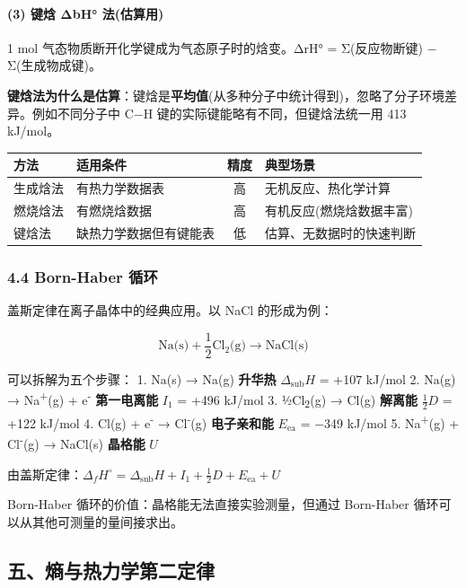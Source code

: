 \paragraph{(3) 键焓 ΔbH° 法(估算用)}\label{ux952eux7113-ux3b4bh-ux6cd5ux4f30ux7b97ux7528}

1 mol 气态物质断开化学键成为气态原子时的焓变。ΔrH° = Σ(反应物断键) − Σ(生成物成键)。

\textbf{键焓法为什么是估算}：键焓是\textbf{平均值}(从多种分子中统计得到)，忽略了分子环境差异。例如不同分子中 C−H 键的实际键能略有不同，但键焓法统一用 413 kJ/mol。

{\def\LTcaptype{none} %
\begin{longtable}[]{@{}llcl@{}}
\toprule\noalign{}
方法 & 适用条件 & 精度 & 典型场景 \\
\midrule\noalign{}
\endhead
\bottomrule\noalign{}
\endlastfoot
生成焓法 & 有热力学数据表 & 高 & 无机反应、热化学计算 \\
燃烧焓法 & 有燃烧焓数据 & 高 & 有机反应(燃烧焓数据丰富) \\
键焓法 & 缺热力学数据但有键能表 & 低 & 估算、无数据时的快速判断 \\
\end{longtable}
}

\subsubsection{4.4 Born-Haber 循环}\label{born-haber-ux5faaux73af}

盖斯定律在离子晶体中的经典应用。以 NaCl 的形成为例：

\[\text{Na(s)} + \frac{1}{2}\text{Cl}_2\text{(g)} \to \text{NaCl(s)}\]

可以拆解为五个步骤：
1. Na(s) → Na(g) \textbf{升华热} \(\Delta_{\text{sub}}H\) = +107 kJ/mol
2. Na(g) → Na\textsuperscript{+}(g) + e\textsuperscript{-} \textbf{第一电离能} \(I_1\) = +496 kJ/mol
3. ½Cl\textsubscript{2}(g) → Cl(g) \textbf{解离能} \(\frac{1}{2}D\) = +122 kJ/mol
4. Cl(g) + e\textsuperscript{-} → Cl\textsuperscript{-}(g) \textbf{电子亲和能} \(E_{\text{ea}}\) = −349 kJ/mol
5. Na\textsuperscript{+}(g) + Cl\textsuperscript{-}(g) → NaCl(s) \textbf{晶格能} \(U\)

由盖斯定律：\(\Delta_f H^\circ = \Delta_{\text{sub}}H + I_1 + \frac{1}{2}D + E_{\text{ea}} + U\)

Born-Haber 循环的价值：晶格能无法直接实验测量，但通过 Born-Haber 循环可以从其他可测量的量间接求出。

\subsection{五、熵与热力学第二定律}\label{ux4e94ux71b5ux4e0eux70edux529bux5b66ux7b2cux4e8cux5b9aux5f8b}

